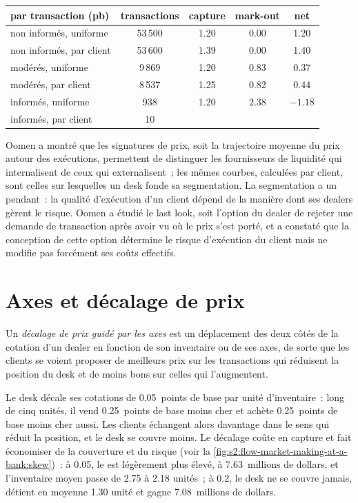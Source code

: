 \begin{center}
\small
\begin{tabular}{@{}lcccc@{}}
\toprule
par transaction (pb) & transactions & capture & mark-out & net\\
\midrule
non informés, uniforme & 53\,500 & 1.20 & 0.00 & 1.20\\
non informés, par client & 53\,600 & 1.39 & 0.00 & 1.40\\
modérés, uniforme & 9\,869 & 1.20 & 0.83 & 0.37\\
modérés, par client & 8\,537 & 1.25 & 0.82 & 0.44\\
informés, uniforme & 938 & 1.20 & 2.38 & $-1.18$\\
informés, par client & 10 & & &\\
\bottomrule
\end{tabular}
\end{center}

Oomen a montré que les signatures de prix, soit la trajectoire moyenne du prix autour des exécutions, permettent de distinguer les fournisseurs de liquidité qui internalisent de ceux qui externalisent~;
les mêmes courbes, calculées par client, sont celles sur lesquelles un desk fonde sa segmentation. La segmentation a un pendant~: la qualité d'exécution d'un client dépend de la manière dont ses dealers
gèrent le risque. Oomen a étudié le last look, soit l'option du dealer de rejeter une demande de transaction après avoir vu où le prix s'est porté, et a constaté que la conception
de cette option détermine le risque d'exécution du client mais ne modifie pas forcément ses coûts effectifs.

\section{Axes et décalage de prix}

\begin{definition}\label{def:s2:flow-market-making-at-a-bank:skew}
Un \emph{décalage de prix guidé par les axes} est un déplacement des deux côtés de la cotation d'un dealer en fonction de son inventaire ou de ses axes, de sorte que les clients
se voient proposer de meilleurs prix sur les transactions qui réduisent la position du desk et de moins bons sur celles qui l'augmentent.
\end{definition}

Le desk décale ses cotations de 0.05~points de base par unité d'inventaire~: long de cinq unités, il vend 0.25~points de base moins cher et achète 0.25~points de base
moins cher aussi. Les clients échangent alors davantage dans le sens qui réduit la position, et le desk se couvre moins. Le décalage coûte en capture et fait économiser de la
couverture et du risque (voir la \cref{fig:s2:flow-market-making-at-a-bank:skew})~: à 0.05, le  est légèrement plus élevé, à 7.63~millions de dollars, et l'inventaire moyen
passe de 2.75 à 2.18 unités~; à 0.2, le desk ne se couvre jamais, détient en moyenne 1.30 unité et gagne 7.08~millions de dollars.

